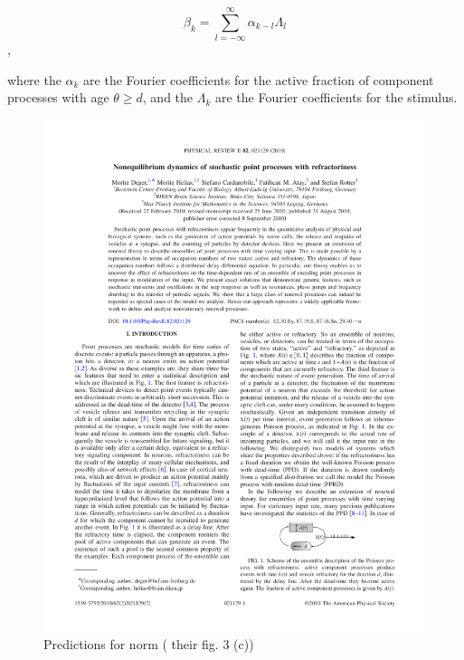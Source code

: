 \begin{equation}\label{bkformula} \beta_k = \sum_{l= - \infty}^{\infty} \alpha_{k-l} \Lambda_l\end{equation},


where the $\alpha_k$ are the Fourier coefficients for the active fraction 
of component processes with age $\theta \geq d$, 
and the $\Lambda_k$ are the Fourier coefficients for the stimulus.


\begin{figure}[h]
	\centering
	\includegraphics*[page=4,viewport=308 567 441 617]{images/Deger2010.pdf} %
	\caption{Predictions for norm (\cite{Deger}  their fig. 3 (c))}
	\label{fig:prednorm}
\end{figure}

